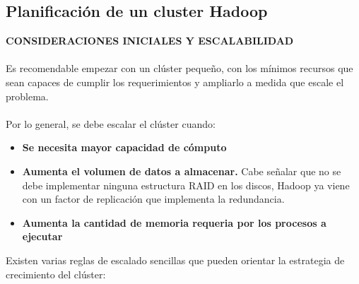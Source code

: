\subsection{Planificación de un cluster Hadoop}
\textbf{CONSIDERACIONES INICIALES Y ESCALABILIDAD}\\\\
Es recomendable empezar con un clúster pequeño, con los mínimos recursos que sean capaces de cumplir los requerimientos y ampliarlo a medida que escale el problema.\\\\
Por lo general, se debe escalar el clúster cuando:
\begin{itemize}
	\item \textbf{Se necesita mayor capacidad de cómputo}
	\item \textbf{Aumenta el volumen de datos a almacenar.} Cabe señalar que no se debe implementar ninguna estructura RAID en los discos, Hadoop ya viene con un factor de replicación que implementa la redundancia.
	\item \textbf{Aumenta la cantidad de memoria requeria por los procesos a ejecutar}
\end{itemize}
Existen varias reglas de escalado sencillas que pueden orientar la estrategia de crecimiento del clúster:
